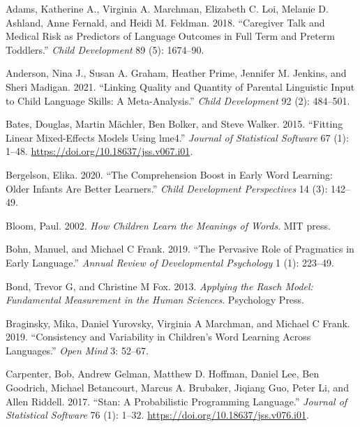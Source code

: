 \documentclass[
  11pt,
]{article}
\newlength{\cslhangindent}
\newenvironment{CSLReferences}[2] %
 {\begin{list}{}{%
  \setlength{\itemindent}{0pt}
  \setlength{\leftmargin}{0pt}
  \setlength{\parsep}{0pt}
  \ifodd #1
   \setlength{\leftmargin}{\cslhangindent}
   \setlength{\itemindent}{-1\cslhangindent}
  \fi
  \setlength{\itemsep}{#2\baselineskip}}}
 {\end{list}}
\begin{document}
\label{refs}
\begin{CSLReferences}{1}{0}
Adams, Katherine A., Virginia A. Marchman, Elizabeth C. Loi, Melanie D.
Ashland, Anne Fernald, and Heidi M. Feldman. 2018. {``Caregiver Talk and
Medical Risk as Predictors of Language Outcomes in Full Term and Preterm
Toddlers.''} \emph{Child Development} 89 (5): 1674--90.

Anderson, Nina J., Susan A. Graham, Heather Prime, Jennifer M. Jenkins,
and Sheri Madigan. 2021. {``Linking Quality and Quantity of Parental
Linguistic Input to Child Language Skills: A Meta-Analysis.''}
\emph{Child Development} 92 (2): 484--501.

Bates, Douglas, Martin Mächler, Ben Bolker, and Steve Walker. 2015.
{``Fitting Linear Mixed-Effects Models Using {lme4}.''} \emph{Journal of
Statistical Software} 67 (1): 1--48.
\url{https://doi.org/10.18637/jss.v067.i01}.

Bergelson, Elika. 2020. {``The Comprehension Boost in Early Word
Learning: Older Infants Are Better Learners.''} \emph{Child Development
Perspectives} 14 (3): 142--49.

Bloom, Paul. 2002. \emph{How Children Learn the Meanings of Words}. MIT
press.

Bohn, Manuel, and Michael C Frank. 2019. {``The Pervasive Role of
Pragmatics in Early Language.''} \emph{Annual Review of Developmental
Psychology} 1 (1): 223--49.

Bond, Trevor G, and Christine M Fox. 2013. \emph{Applying the Rasch
Model: Fundamental Measurement in the Human Sciences}. Psychology Press.

Braginsky, Mika, Daniel Yurovsky, Virginia A Marchman, and Michael C
Frank. 2019. {``Consistency and Variability in Children's Word Learning
Across Languages.''} \emph{Open Mind} 3: 52--67.

Carpenter, Bob, Andrew Gelman, Matthew D. Hoffman, Daniel Lee, Ben
Goodrich, Michael Betancourt, Marcus A. Brubaker, Jiqiang Guo, Peter Li,
and Allen Riddell. 2017. {``Stan: A Probabilistic Programming
Language.''} \emph{Journal of Statistical Software} 76 (1): 1--32.
\url{https://doi.org/10.18637/jss.v076.i01}.


\end{CSLReferences}
\end{document}
